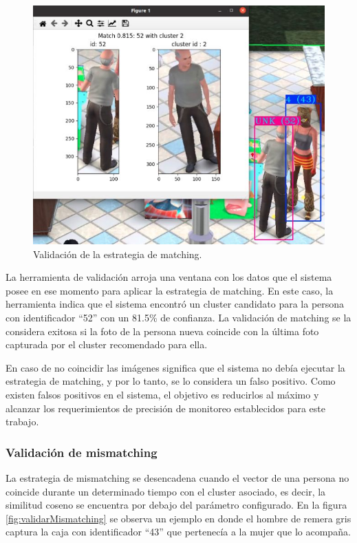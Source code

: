 \begin{figure}[ht]
	\centering
	\includegraphics[scale=.7]{./Figures/validarMatching.jpg}
	\caption{Validación de la estrategia de matching.}
	\label{fig:validarMatching}
\end{figure}

La herramienta de validación arroja una ventana con los datos que el sistema posee en ese momento para aplicar la estrategia de matching. En este caso, la herramienta indica que el sistema encontró un cluster candidato para la persona con identificador ``52'' con un 81.5\% de confianza. La validación de matching se la considera exitosa si la foto de la persona nueva coincide con la última foto capturada por el cluster recomendado para ella. 

En caso de no coincidir las imágenes significa que el sistema no debía ejecutar la estrategia de matching, y por lo tanto, se lo considera un falso positivo. Como existen falsos positivos en el sistema, el objetivo es reducirlos al máximo y alcanzar los requerimientos de precisión de monitoreo establecidos para este trabajo.

\newpage

\subsubsection{Validación de mismatching}

La estrategia de mismatching se desencadena cuando el vector de una persona no coincide durante un determinado tiempo con el cluster asociado, es decir, la similitud coseno se encuentra por debajo del parámetro configurado. En la figura \ref{fig:validarMismatching} se observa un ejemplo en donde el hombre de remera gris captura la caja con identificador ``43'' que pertenecía a la mujer que lo acompaña.

